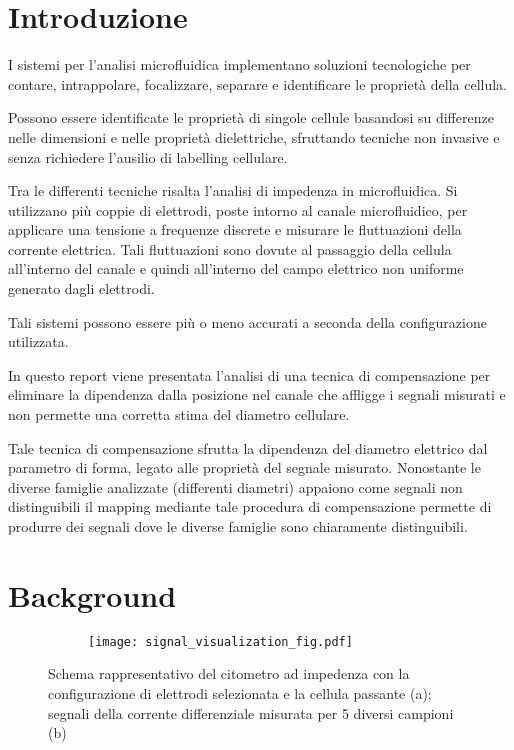 \section{Introduzione}

I sistemi per l'analisi microfluidica implementano soluzioni tecnologiche per contare, intrappolare, focalizzare, separare e identificare le proprietà della cellula. 

Possono essere identificate le proprietà di singole cellule basandosi su differenze nelle dimensioni e nelle proprietà dielettriche, sfruttando tecniche non invasive e senza richiedere l'ausilio di labelling cellulare.

Tra le differenti tecniche risalta l'analisi di impedenza in microfluidica. Si utilizzano più coppie di elettrodi, poste intorno al canale microfluidico, per applicare una tensione a frequenze discrete e misurare le fluttuazioni della corrente elettrica. Tali fluttuazioni sono dovute al passaggio della cellula all'interno del canale e quindi all'interno del campo elettrico non uniforme generato dagli elettrodi. 

Tali sistemi possono essere più o meno accurati a seconda della configurazione utilizzata.

In questo report viene presentata l'analisi di una tecnica di compensazione per eliminare la dipendenza dalla posizione nel canale che affligge i segnali misurati e non permette una corretta stima del diametro cellulare.

Tale tecnica di compensazione sfrutta la dipendenza del diametro elettrico dal parametro di forma, legato alle proprietà del segnale misurato. Nonostante le diverse famiglie analizzate (differenti diametri) appaiono come segnali non distinguibili il mapping mediante tale procedura di compensazione permette di produrre dei segnali dove le diverse famiglie sono chiaramente distinguibili.

\section{Background}

\begin{figure*}
	\begin{subfigure}{0.6\linewidth}
		\centering
		\footnotesize{ \def\svgwidth{\linewidth}
	    }
		\caption{}
	\end{subfigure}\hfill
	\begin{subfigure}{0.4\linewidth}
	\centering
	\texttt{[image: signal\_visualization\_fig.pdf]}
	\caption{}
\end{subfigure}
\caption{Schema rappresentativo del citometro ad impedenza con la configurazione di elettrodi selezionata e la cellula passante (a); segnali della corrente differenziale misurata per 5 diversi campioni (b)}
\label{fig:generale}
\end{figure*}

